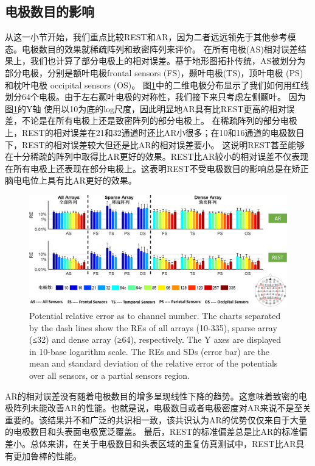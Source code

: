 \subsection{电极数目的影响}
从这一小节开始，我们重点比较REST和AR，因为二者远远领先于其他参考模态。电极数目的效果就稀疏阵列和致密阵列来评价。 在所有电极(AS)相对误差结果上，我们也计算了部分电极上的相对误差。基于地形图拓扑传统，AS被划分为部分电极，分别是额叶电极frontal sensors
(FS)，颞叶电极(TS)，顶叶电极 (PS) 和枕叶电极 occipital sensors (OS)。 图\ref{2.4}中的二维电极分布显示了我们如何用红线划分64个电极。由于左右颞叶电极的对称性，我们接下来只考虑左侧颞叶。 因为图\ref{2.4}的Y轴
使用以10为底的log尺度，因此明显地AR具有比REST更高的相对误差，不论是在所有电极上还是致密阵列的部分电极上。 在稀疏阵列的部分电极上，REST的相对误差在21和32通道时还比AR小很多；在10和16通道的电极数目下，REST的相对误差较大但还是比AR的相对误差要小。 这说明REST甚至能够在十分稀疏的阵列中取得比AR更好的效果。REST比AR较小的相对误差不仅表现在所有电极上还表现在部分电极上。这表明REST不受电极数目的影响总是在矫正脑电电位上具有比AR更好的效果。
\begin{figure}[h!]
	\centering
	\includegraphics[width=15cm]{pic/JNE/figure4.png}
	\caption{Potential relative error as to channel number. The charts separated by the dash lines show the REs of all arrays (10-335), sparse array (≤32) and dense array (≥64), respectively. The Y axes are displayed in 10-base logarithm scale. The REs and SDs (error bar) are the mean and standard deviation of the relative error of the potentials over all sensors, or a partial sensors region.}
	\label{2.4}
\end{figure}
AR的相对误差没有随着电极数目的增多呈现线性下降的趋势。这意味着致密的电极阵列未能改善AR的性能。也就是说，电极数目或者电极密度对AR来说不是至关重要的。该结果并不和广泛的共识相一致，该共识认为AR的优势仅仅来自于大量的电极数目和头表面电极宽泛覆盖。
最后，REST的标准偏差总是比AR的标准偏差小。总体来讲，在关于电极数目和头表区域的重复仿真测试中，REST比AR具有更加鲁棒的性能。

